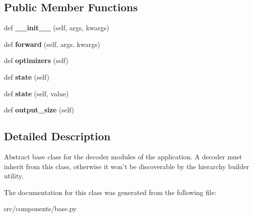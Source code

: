 \subsection*{Public Member Functions}
\begin{DoxyCompactItemize}
\item 
def {\bfseries \+\_\+\+\_\+init\+\_\+\+\_\+} (self, args, kwargs)\hypertarget{classbase_1_1Decoder_a88d9b648b9da9127c78b05ed0a6df34f}{}\label{classbase_1_1Decoder_a88d9b648b9da9127c78b05ed0a6df34f}

\item 
def {\bfseries forward} (self, args, kwargs)\hypertarget{classbase_1_1Decoder_ac6711e9af0b7ab314a528c413f2ab620}{}\label{classbase_1_1Decoder_ac6711e9af0b7ab314a528c413f2ab620}

\item 
def {\bfseries optimizers} (self)\hypertarget{classbase_1_1Decoder_aa81fcc7acc9aeaa2f46adfa708bd9b04}{}\label{classbase_1_1Decoder_aa81fcc7acc9aeaa2f46adfa708bd9b04}

\item 
def {\bfseries state} (self)\hypertarget{classbase_1_1Decoder_a9192c673b5fa6baee20e824e17510f96}{}\label{classbase_1_1Decoder_a9192c673b5fa6baee20e824e17510f96}

\item 
def {\bfseries state} (self, value)\hypertarget{classbase_1_1Decoder_adf38a0b19e1a15de7073ccc9beeda86d}{}\label{classbase_1_1Decoder_adf38a0b19e1a15de7073ccc9beeda86d}

\item 
def {\bfseries output\+\_\+size} (self)\hypertarget{classbase_1_1Decoder_a1f31b5d3c97caf158899ec4f11d6abf4}{}\label{classbase_1_1Decoder_a1f31b5d3c97caf158899ec4f11d6abf4}

\end{DoxyCompactItemize}


\subsection{Detailed Description}
\begin{DoxyVerb}Abstract base class for the decoder modules of the application. A decoder must
inherit from this class, otherwise it won't be discoverable by the hierarchy
builder utility.
\end{DoxyVerb}
 

The documentation for this class was generated from the following file\+:\begin{DoxyCompactItemize}
\item 
src/components/base.\+py\end{DoxyCompactItemize}
